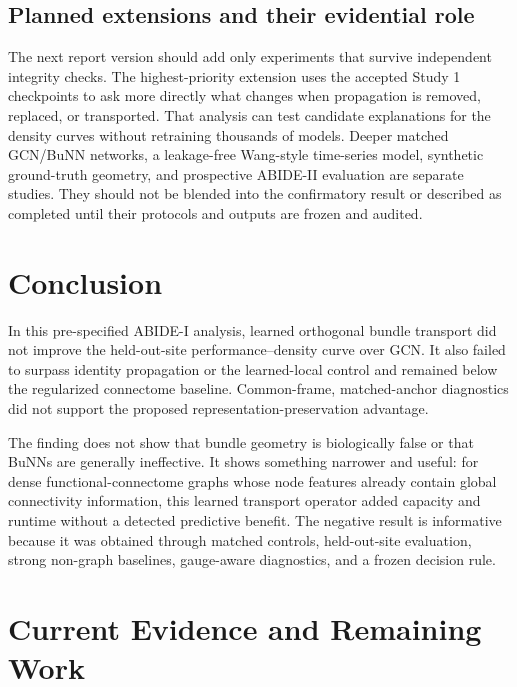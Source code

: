\documentclass[11pt,a4paper]{article}
\begin{document}
\subsection{Planned extensions and their evidential role}

The next report version should add only experiments that survive independent
integrity checks. The highest-priority extension uses the accepted Study 1
checkpoints to ask more directly what changes when propagation is removed,
replaced, or transported. That analysis can test candidate explanations for
the density curves without retraining thousands of models. Deeper matched
GCN/BuNN networks, a leakage-free Wang-style time-series model, synthetic
ground-truth geometry, and prospective ABIDE-II evaluation are separate
studies. They should not be blended into the confirmatory result or described
as completed until their protocols and outputs are frozen and audited.

\section{Conclusion}

In this pre-specified ABIDE-I analysis, learned orthogonal bundle transport did
not improve the held-out-site performance--density curve over GCN. It also
failed to surpass identity propagation or the learned-local control and
remained below the regularized connectome baseline. Common-frame,
matched-anchor diagnostics did not support the proposed
representation-preservation advantage.

The finding does not show that bundle geometry is biologically false or that
BuNNs are generally ineffective. It shows something narrower and useful:
for dense functional-connectome graphs whose node features already contain
global connectivity information, this learned transport operator added
capacity and runtime without a detected predictive benefit. The negative
result is informative because it was obtained through matched controls,
held-out-site evaluation, strong non-graph baselines, gauge-aware diagnostics,
and a frozen decision rule.

\clearpage
\section*{Current Evidence and Remaining Work}
\end{document}
